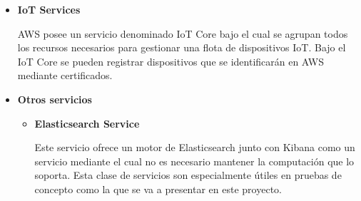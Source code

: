 \documentclass[../../memoria.tex]{subfiles}
\begin{document}
\begin{itemize}
    \item \textbf{IoT Services}
          \par
          AWS posee un servicio denominado IoT Core bajo el cual se agrupan todos los recursos necesarios para gestionar una flota de dispositivos IoT. Bajo el IoT Core se pueden registrar dispositivos que se identificarán en AWS mediante certificados.

    \item \textbf{Otros servicios}
          \begin{itemize}
              \item \textbf{Elasticsearch Service}
                    \par
                    Este servicio ofrece un motor de Elasticsearch junto con Kibana como un servicio mediante el cual no es necesario mantener la computación que lo soporta. Esta clase de servicios son especialmente útiles en pruebas de concepto como la que se va a presentar en este proyecto.
          \end{itemize}
\end{itemize}
\end{document}
